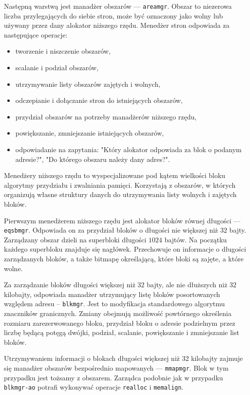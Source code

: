 \documentclass[12pt,a4paper,titlepage,twoside]{mwart}
\begin{document}
Następną warstwą jest manadżer obszarów --- \texttt{areamgr}. Obszar to
niezerowa liczba przylegających do siebie stron, może być oznaczony jako wolny
lub używany przez dany alokator niższego rzędu. Menedżer stron odpowiada za
następujące operacje:
\begin{itemize}
\item tworzenie i niszczenie obszarów,
\item scalanie i podział obszarów,
\item utrzymywanie listy obszarów zajętych i wolnych,
\item odczepianie i dołączanie stron do istniejących obszarów,
\item przydział obszarów na potrzeby manadżerów niższego rzędu,
\item powiększanie, zmniejszanie istniejących obszarów,
\item odpowiadanie na zapytania: "Który alokator odpowiada za blok o podanym
adresie?", "Do którego obszaru należy dany adres?".
\end{itemize}

Menedżery niższego rzędu to wyspecjalizowane pod kątem wielkości bloku
algorytmy przydziału i zwalniania pamięci. Korzystają z obszarów, w których
organizują własne struktury danych do utrzymywania listy wolnych i zajętych
bloków.

Pierwszym menedżerem niższego rzędu jest alokator bloków równej długości ---
\texttt{eqsbmgr}.  Odpowiada on za przydział bloków o długości nie większej niż
$32$ bajty.  Zarządzany obszar dzieli na superbloki długości $1024$ bajtów. Na
początku każdego superbloku znajduje się nagłówek. Przechowuje on informacje o
długości zarządzanych bloków, a także bitmapę określającą, które bloki
są zajęte, a które wolne.

Za zarządzanie bloków długości większej niż $32$ bajty, ale nie dłuższych niż
$32$ kilobajty, odpowiada manadżer utrzymujący listę bloków posortowanych
względem adresu -- \texttt{blkmgr}. Jest to modyfikacja standardowego algorytmu
znaczników granicznych. Zmiany obejmują możliwość powtórnego określenia rozmiaru
zarezerwowanego bloku, przydział bloku o adresie podzielnym przez liczbę będącą
potęgą dwójki, podział, scalanie, powiększanie i zmniejszanie list bloków.

Utrzymywaniem informacji o blokach długości większej niż $32$ kilobajty zajmuje
się manadżer obszarów bezpośrednio mapowanych --- \texttt{mmapmgr}. Blok w tym
przypadku jest tożsamy z obszarem. Zarządca podobnie jak w przypadku
\texttt{blkmgr-ao} potrafi wykonywać operacje \texttt{realloc} i
\texttt{memalign}.
\end{document}
